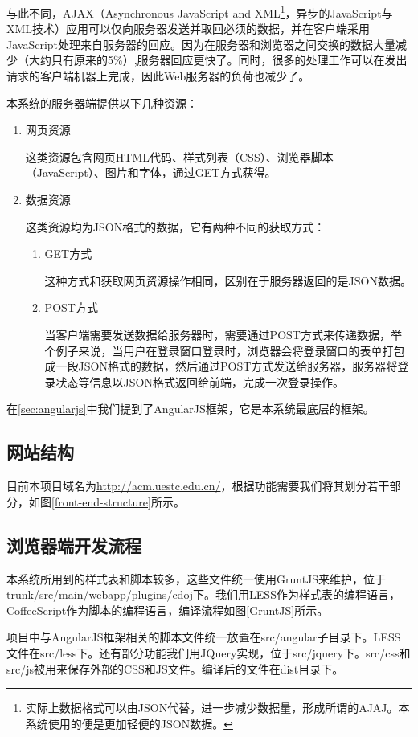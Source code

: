 与此不同，AJAX（Asynchronous JavaScript and XML\footnote{实际上数据格式可以由JSON代替，进一步减少数据量，形成所谓的AJAJ。本系统使用的便是更加轻便的JSON数据。}，异步的JavaScript与XML技术）应用可以仅向服务器发送并取回必须的数据，并在客户端采用JavaScript处理来自服务器的回应。因为在服务器和浏览器之间交换的数据大量减少（大约只有原来的5\%）,服务器回应更快了。同时，很多的处理工作可以在发出请求的客户端机器上完成，因此Web服务器的负荷也减少了。

本系统的服务器端提供以下几种资源：
\begin{enumerate}
	\item 网页资源

	这类资源包含网页HTML代码、样式列表（CSS）、浏览器脚本（JavaScript）、图片和字体，通过GET方式获得。
	\item 数据资源

	这类资源均为JSON格式的数据，它有两种不同的获取方式：
	\begin{enumerate}
		\item GET方式

		这种方式和获取网页资源操作相同，区别在于服务器返回的是JSON数据。
		\item POST方式

		当客户端需要发送数据给服务器时，需要通过POST方式来传递数据，举个例子来说，当用户在登录窗口登录时，浏览器会将登录窗口的表单打包成一段JSON格式的数据，然后通过POST方式发送给服务器，服务器将登录状态等信息以JSON格式返回给前端，完成一次登录操作。
	\end{enumerate}
\end{enumerate}

在\ref{sec:angularjs}中我们提到了AngularJS框架，它是本系统最底层的框架。

\subsection{网站结构}

目前本项目域名为\url{http://acm.uestc.edu.cn/}，根据功能需要我们将其划分若干部分，如图\ref{front-end-structure}所示。

\subsection{浏览器端开发流程}

本系统所用到的样式表和脚本较多，这些文件统一使用GruntJS来维护，位于trunk/src/main/webapp/plugins/cdoj下。我们用LESS作为样式表的编程语言，CoffeeScript作为脚本的编程语言，编译流程如图\ref{GruntJS}所示。


项目中与AngularJS框架相关的脚本文件统一放置在src/angular子目录下。LESS文件在src/less下。还有部分功能我们用JQuery实现，位于src/jquery下。src/css和src/js被用来保存外部的CSS和JS文件。编译后的文件在dist目录下。

